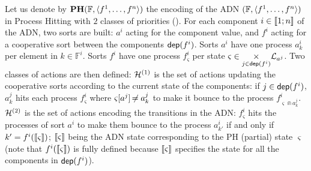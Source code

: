 Let us denote by $\mathbf{PH}(\mathbb F, \langle f^1, \dots, f^n\rangle)$ the encoding of the ADN $(\mathbb F, \langle f^1, \dots, f^n\rangle)$ in Process Hitting with $2$ classes
of priorities ().
For each component $i\in\llbracket 1; n \rrbracket$ of the ADN, two sorts are built: $a^i$ acting for the component
value, and $f^i$ acting for a cooperative sort between the components $\mathsf{dep}(f^i)$.
Sorts $a^i$ have one process $a^i_k$ per element in $k\in\mathbb F^i$.
Sorts $f^i$ have one process $f^i_\varsigma$ per state $\varsigma \in \underset{j\in\mathsf{dep}(f^i)}{\times}
\mathcal{L}_{a^j}$.
Two classes of actions are then defined:
$\mathcal{H}^{(1)}$ is the set of actions updating the cooperative sorts according to the current state of the
components:
if $j\in\mathsf{dep}(f^i)$, $a^j_k$ hits each process $f^i_\varsigma$ where $\varsigma[{a^j}]\not\nobreak\mkern -2mu =
a^j_k$ to make it bounce to the process $f^i_{\varsigma \Cap a^j_k}$.
$\mathcal{H}^{(2)}$ is the set of actions encoding the transitions in the ADN:
$f^i_\varsigma$ hits the processes of sort $a^i$ to make them bounce to the process
$a^i_{k'}$ if and only if $k'=f^i(\llbracket\varsigma\rrbracket)$;
$\llbracket\varsigma\rrbracket$ being the ADN state corresponding to the PH (partial) state $\varsigma$ (note that
$f^i(\llbracket\varsigma\rrbracket)$ is fully defined because $\llbracket\varsigma\rrbracket$ specifies the state for all
the components in $\mathsf{dep}(f^i)$).

